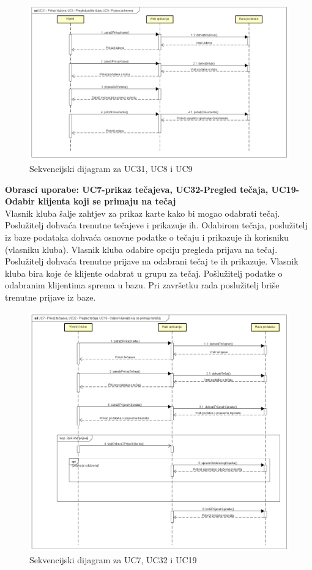 				\begin{figure}[H]
					\centering
					\includegraphics[width=\textwidth]{slike/seq_dijagram1.png}
					\caption{Sekvencijski dijagram za UC31, UC8 i UC9}
					\label{fig:my_label}
				\end{figure}
				\eject
				\textbf{Obrasci uporabe: UC7-prikaz tečajeva, UC32-Pregled tečaja, UC19- Odabir klijenta koji se primaju na tečaj}\\
			
				Vlasnik kluba šalje zahtjev za prikaz karte kako bi mogao odabrati tečaj. Poslužitelj dohvaća trenutne tečajeve i prikazuje ih. Odabirom tečaja, poslužitelj iz baze podataka dohvaća osnovne podatke o tečaju i prikazuje ih korisniku (vlasniku kluba). Vlasnik kluba odabire opciju pregleda prijava na tečaj. Poslužitelj dohvaća trenutne prijave na odabrani tečaj te ih prikazuje. Vlasnik kluba bira koje će klijente odabrat u grupu za tečaj. Pošlužitelj podatke o odabranim klijentima sprema u bazu. Pri završetku rada poslužitelj briše trenutne prijave iz baze.
			
				\begin{figure}[H]
					\centering
					\includegraphics[width=\textwidth]{slike/seq_dijagram2.png}
					\caption{Sekvencijski dijagram za UC7, UC32 i UC19}
					\label{fig:my_label}
				\end{figure}
			\bigskip
			
